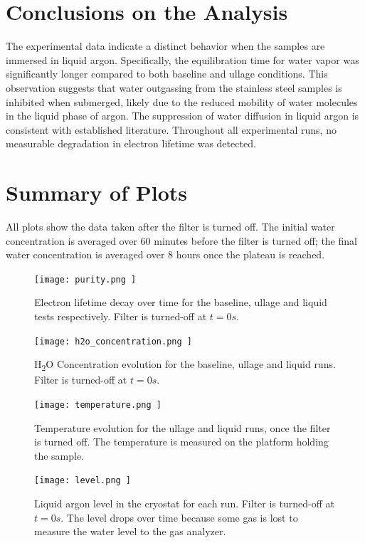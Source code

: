 \documentclass[12pt]{article}
\begin{document}
\section*{Conclusions on the Analysis}
The experimental data indicate a distinct behavior when the samples are immersed in liquid argon. Specifically, the equilibration time for water vapor was significantly longer compared to both baseline and ullage conditions. This observation suggests that water outgassing from the stainless steel samples is inhibited when submerged, likely due to the reduced mobility of water molecules in the liquid phase of argon. The suppression of water diffusion in liquid argon is consistent with established literature. Throughout all experimental runs, no measurable degradation in electron lifetime was detected.

\section*{Summary of Plots}

All plots show the data taken after the filter is turned off. The initial water concentration is averaged over 60 minutes before the filter is turned off; the final water concentration is averaged over 8 hours once the plateau is reached.

\begin{figure}[H]
    \centering
    \texttt{[image:  purity.png ]}
    \centering
    \caption{Electron lifetime decay over time for the baseline, ullage and liquid tests respectively. Filter is turned-off at $t=0 s$.}
    \label{fig:purity}
\end{figure}

\begin{figure}[H]
    \centering
    \texttt{[image:  h2o\_concentration.png ]}
    \centering
    \caption{H\textsubscript{2}O Concentration evolution for the baseline, ullage and liquid runs. Filter is turned-off at $t=0 s$.}
    \label{fig:h2o}
\end{figure}

\begin{figure}[H]
    \centering
    \texttt{[image:  temperature.png ]}
    \centering
    \caption{Temperature evolution for the ullage and liquid runs, once the filter is turned off. The temperature is measured on the platform holding the sample.}
    \label{fig:temperature}
\end{figure}

\begin{figure}[H]
    \centering
    \texttt{[image:  level.png ]}
    \centering
    \caption{Liquid argon level in the cryostat for each run. Filter is turned-off at $t=0 s$. The level drops over time because some gas is lost to measure the water level to the gas analyzer.}
    \label{fig:level}
\end{figure}
\end{document}

